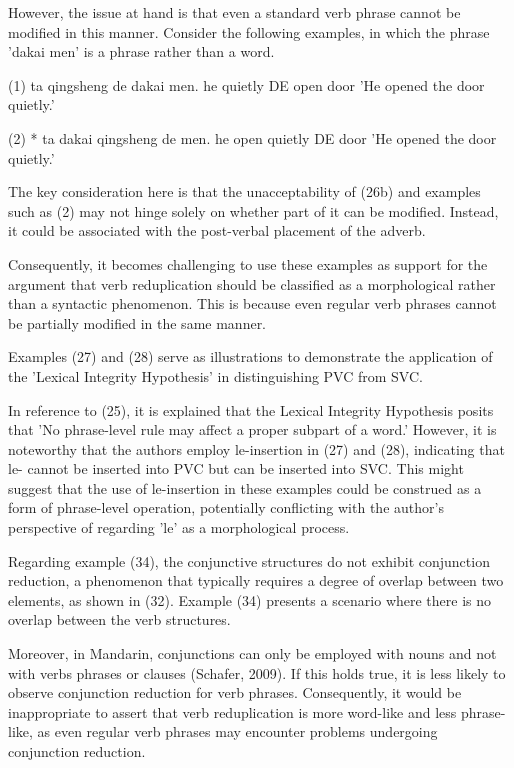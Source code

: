\documentclass[fleqn,twoside]{article}
\begin{document}
{However, the issue at hand is that even a standard verb phrase cannot be modified in this manner. Consider the following examples, in which the phrase 'dakai men' is a phrase rather than a word. 

(1) ta qingsheng de dakai men. 
       he  quietly    DE open door 
      'He opened the door quietly.'

(2) * ta dakai qingsheng de men. 
         he open quietly       DE door
         'He opened the door quietly.'

The key consideration here is that the unacceptability of (26b) and examples such as (2) may not hinge solely on whether part of it can be modified. Instead, it could be associated with the post-verbal placement of the adverb. 

Consequently, it becomes challenging to use these examples as support for the argument that verb reduplication should be classified as a morphological rather than a syntactic phenomenon. This is because even regular verb phrases cannot be partially modified in the same manner. 


Examples (27) and (28) serve as illustrations to demonstrate the application of the 'Lexical Integrity Hypothesis' in distinguishing PVC from SVC.

In reference to (25), it is explained that the Lexical Integrity Hypothesis posits that 'No
phrase-level rule may affect a proper subpart of a word.' However, it is noteworthy that the authors
employ le-insertion in (27) and (28), indicating that le- cannot be inserted into PVC but can be
inserted into SVC. This might suggest that the use of le-insertion in these examples could be
construed as a form of phrase-level operation, potentially conflicting with the author's perspective
of regarding 'le' as a morphological process.

Regarding example (34), the conjunctive structures do not exhibit conjunction reduction, a phenomenon that typically requires a degree of overlap between two elements, as shown in (32). Example (34) presents a scenario where there is no overlap between the verb structures. 

Moreover, in Mandarin, conjunctions can only be employed with nouns and not with verbs phrases or
clauses (Schafer, 2009). If this holds true, it is less likely to observe conjunction reduction for
verb phrases. Consequently, it would be inappropriate to assert that verb reduplication is more
word-like and less phrase-like, as even regular verb phrases may encounter problems undergoing
conjunction reduction. 




}
\end{document}
